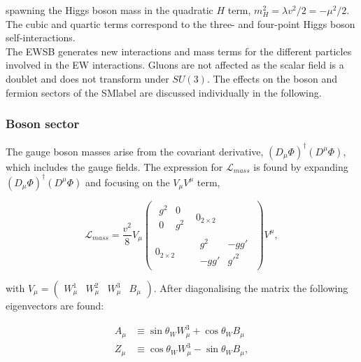 spawning the Higgs boson mass in the quadratic $H$ term, $m_H^2=\lambda v^2/2 = -\mu^2/2$.
The cubic and quartic terms correspond to the three- and four-point Higgs boson self-interactions.\\

The \acrshort{EWSB} generates new interactions and mass terms for the different particles involved in the \acrshort{EW} interactions.
Gluons are not affected as the scalar field is a doublet and does not transform under $SU(3)$. The effects on the boson and fermion sectors of the \acrshort{SMlabel} are discussed individually in the following. 

\subsubsection{Boson sector}

The gauge boson masses arise from the covariant derivative, $(D_\mu\Phi)^\dag(D^\mu\Phi)$, which includes the gauge fields. The expression for $\mathcal{L}_{mass}$ is found by expanding $(D_\mu\Phi)^\dag(D^\mu\Phi)$ and focusing on the $V_\mu V^\mu$ term,

\begin{equation}
\label{Theory_eq:Lgaugemass}
\mathcal{L}_{mass} = \frac{v^2}{8}
V_\mu
\begin{pmatrix} \begin{matrix} g^2 & 0 \\ 0 & g^2 \end{matrix} & 0_{2\times2} \\ 0_{2\times2} & \begin{matrix} g^2 & -gg' \\ -gg' & g'^2 \end{matrix}
\end{pmatrix} V^\mu ,
\end{equation}

with $V_\mu = \begin{pmatrix} W_\mu^1 & W_\mu^2 & W_\mu^3 & B_\mu
\end{pmatrix}$. After diagonalising the matrix the following eigenvectors are found:

\begin{equation}
\begin{split}
    A_\mu &\equiv \sin\theta_W W_\mu^3 + \cos\theta_WB_\mu \\
    Z_\mu &\equiv \cos\theta_W W_\mu^3 - \sin\theta_WB_\mu,
\end{split}
\end{equation}

